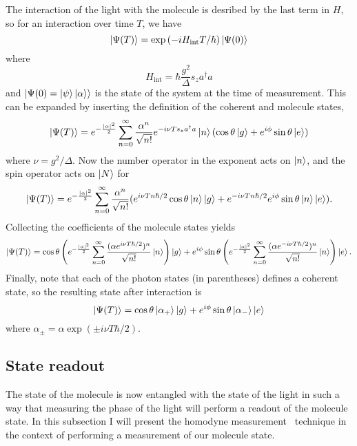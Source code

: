 The interaction of the light with the molecule is desribed by the last term in
$H$, so for an interaction over time $T$, we have
%
\begin{equation}
  \ket{\Psi(T)} = \exp\left(-iH_\text{int}T/\hbar\right)\ket{\Psi(0)}
\end{equation}
%
where
%
\begin{equation}
  H_\text{int} = \hbar \frac{g^2}{\Delta} s_z a^\dagger a
\end{equation}
%
and $\ket{\Psi(0) = \ket{\psi}\ket{\alpha}}$ is the state of the system at the
time of measurement. This can be expanded by inserting the definition of the
coherent and molecule states,
%
\begin{equation}
  \ket{\Psi(T)} = e^{-\frac{|\alpha|^2}{2}}\sum_{n=0}^\infty
   \frac{\alpha^n}{\sqrt{n!}} e^{-i\nu T s_z a^\dagger a} \ket{n} (\cos\theta
   \ket{g} + e^{i\phi}\sin\theta\ket{e})
\end{equation}
%
where $\nu = g^2/\Delta$.
Now the number operator in the exponent acts on $\ket{n}$, and the spin
operator acts on $\ket{N}$ for
%
\begin{equation}
   \ket{\Psi(T)} = e^{-\frac{|\alpha|^2}{2}}\sum_{n=0}^\infty
   \frac{\alpha^n}{\sqrt{n!}} (e^{i\nu T n \hbar/2}\cos\theta\ket{n}\ket{g} +
   e^{-i\nu T n \hbar/2}e^{i\phi}\sin\theta\ket{n}\ket{e}).
\end{equation}
%
Collecting the coefficients of the molecule states yields
%
\begin{equation}
  \ket{\Psi(T)} = \cos\theta\left(e^{-\frac{|\alpha|^2}{2}}\sum_{n=0}^\infty
   \frac{(\alpha e^{i\nu T \hbar/2})^n}{\sqrt{n!}}\ket{n}\right)\ket{g} +  
    e^{i\phi}\sin\theta\left(e^{-\frac{|\alpha|^2}{2}}\sum_{n=0}^\infty
   \frac{(\alpha e^{-i\nu T \hbar/2})^n}{\sqrt{n!}}\ket{n}\right)\ket{e}.
\end{equation}
%
Finally, note that each of the photon states (in parentheses) defines a
coherent state, so the resulting state after interaction is
%
\begin{equation}
  \ket{\Psi(T)} = \cos\theta\ket{\alpha_+}\ket{g} +
  e^{i\phi}\sin\theta\ket{\alpha_-}\ket{e}
\end{equation}
%
where $\alpha_\pm = \alpha \exp(\pm i \nu T \hbar/2)$.

\subsection{State readout}

The state of the molecule is now entangled with the state of the light in such
a way that measuring the phase of the light will perform a readout of the
molecule state. In this subsection I will present the homodyne
measurement~\cite{agarwal2012} technique in the context of performing a
measurement of our molecule state.

